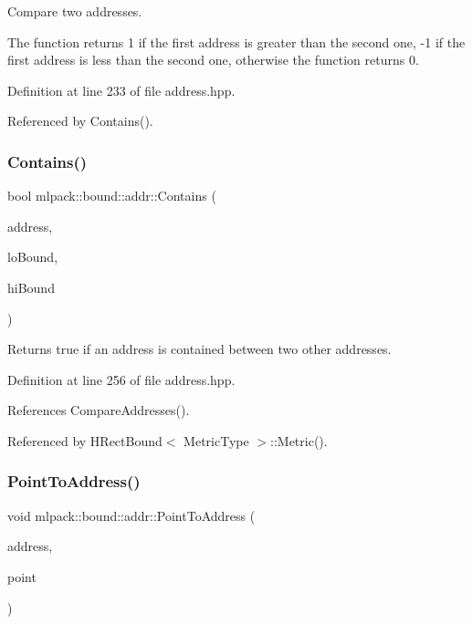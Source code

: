 Compare two addresses. 

The function returns 1 if the first address is greater than the second one, -\/1 if the first address is less than the second one, otherwise the function returns 0. 

Definition at line 233 of file address.\+hpp.



Referenced by Contains().

\mbox{\label{namespacemlpack_1_1bound_1_1addr_a64110a8c86f23288f4fef77ff8ac63a4}} 
\subsubsection{Contains()}
{\footnotesize\ttfamily bool mlpack\+::bound\+::addr\+::\+Contains (\begin{DoxyParamCaption}\item[{const Address\+Type1 \&}]{address,  }\item[{const Address\+Type2 \&}]{lo\+Bound,  }\item[{const Address\+Type3 \&}]{hi\+Bound }\end{DoxyParamCaption})}



Returns true if an address is contained between two other addresses. 



Definition at line 256 of file address.\+hpp.



References Compare\+Addresses().



Referenced by H\+Rect\+Bound$<$ Metric\+Type $>$\+::\+Metric().

\mbox{\label{namespacemlpack_1_1bound_1_1addr_acfd59826c56bc489ec735101a942eb79}} 
\subsubsection{Point\+To\+Address()}
{\footnotesize\ttfamily void mlpack\+::bound\+::addr\+::\+Point\+To\+Address (\begin{DoxyParamCaption}\item[{Address\+Type \&}]{address,  }\item[{const Vec\+Type \&}]{point }\end{DoxyParamCaption})}



